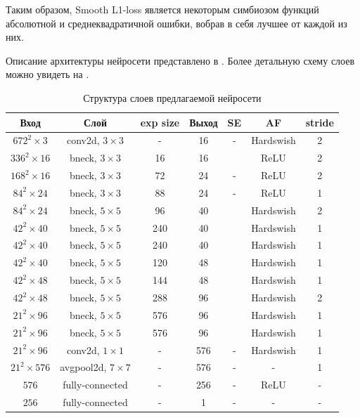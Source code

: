 Таким образом, Smooth L1-loss является некоторым симбиозом функций абсолютной и среднеквадратичной ошибки, вобрав в себя лучшее от каждой из них.

Описание архитектуры нейросети представлено в . Более детальную схему слоев можно увидеть на . 

\begin{table}[!htbp]
	\centering
	\small
	\begin{tabular}{|c|c|c|c|c|c|c|}
		\hline
		Вход & Слой & exp size & Выход & SE & AF & stride\\ \hline
		$672^2 \times 3$ & conv2d, $3 \times 3$ & - & 16 & - & Hardswish & 2\\ \hline
		$336^2 \times 16$ & bneck, $3 \times 3$ & 16 & 16 & \checkmark & ReLU & 2\\ \hline
		$168^2 \times 16$ & bneck, $3 \times 3$ & 72 & 24 & - & ReLU & 2\\ \hline
		$84^2 \times 24$ & bneck, $3 \times 3$ & 88 & 24 & - & ReLU & 1\\ \hline
		$84^2 \times 24$ & bneck, $5 \times 5$ & 96 & 40 & \checkmark & Hardswish & 2\\ \hline
		$42^2 \times 40$ & bneck, $5 \times 5$ & 240 & 40 & \checkmark & Hardswish & 1\\ \hline
		$42^2 \times 40$ & bneck, $5 \times 5$ & 240 & 40 & \checkmark & Hardswish & 1\\ \hline
		$42^2 \times 40$ & bneck, $5 \times 5$ & 120 & 48 & \checkmark & Hardswish & 1\\ \hline
		$42^2 \times 48$ & bneck, $5 \times 5$ & 144 & 48 & \checkmark & Hardswish & 1\\ \hline
		$42^2 \times 48$ & bneck, $5 \times 5$ & 288 & 96 & \checkmark & Hardswish & 2\\ \hline
		$21^2 \times 96$ & bneck, $5 \times 5$ & 576 & 96 & \checkmark & Hardswish & 1\\ \hline
		$21^2 \times 96$ & bneck, $5 \times 5$ & 576 & 96 & \checkmark & Hardswish & 1\\ \hline
		$21^2 \times 96$ & conv2d, $1 \times 1$ & - & 576 & - & Hardswish & 1\\ \hline
		$21^2 \times 576$ & avgpool2d, $7 \times 7$ & - & 576 & - & - & 1\\ \hline
		$576$ & fully-connected & - & 256 & - & ReLU & -\\ \hline
		$256$ & fully-connected & - & 1 & - & - & -\\ \hline
	\end{tabular}
	\caption{Структура слоев предлагаемой нейросети}
	\label{tab:nn_architecture}	
\end{table}

